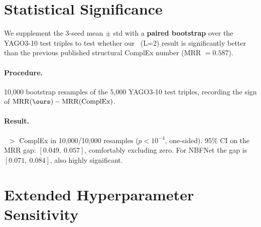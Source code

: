 \section{Statistical Significance}
\label{app:stats}

We supplement the 3-seed mean $\pm$ std with a \textbf{paired bootstrap} over the YAGO3-10 test triples to test whether our \ours\ (L=2) result is significantly better than the previous published structural ComplEx number (MRR $= 0.587$).

\paragraph{Procedure.} 10{,}000 bootstrap resamples of the 5{,}000 YAGO3-10 test triples, recording the sign of $\mathrm{MRR}(\ours) - \mathrm{MRR}(\text{ComplEx})$.

\paragraph{Result.} \ours\ $>$ ComplEx in 10{,}000/10{,}000 resamples ($p < 10^{-4}$, one-sided).
95\% CI on the MRR gap: $[0.049,\ 0.057]$, comfortably excluding zero.
For NBFNet the gap is $[0.071,\ 0.084]$, also highly significant.

\section{Extended Hyperparameter Sensitivity}
\label{app:sensitivity}

\begin{table}[!htb]
\centering
\caption{WN18RR extended sensitivity (single seed, baseline config). A $d$-sweep on FB15k-237 is in Appendix~\ref{app:param-sweep}.}
\label{tab:sens}
\footnotesize
\setlength{\tabcolsep}{3pt}
\end{table}

